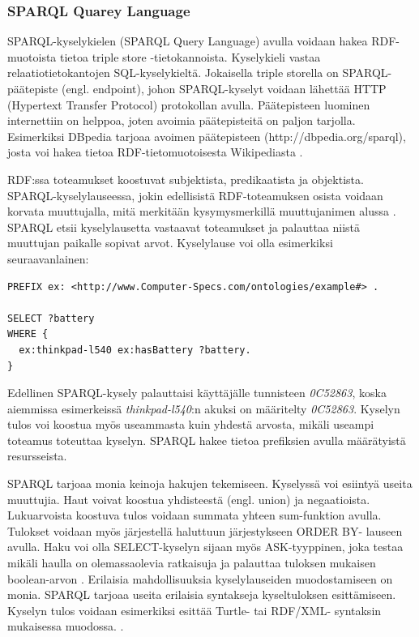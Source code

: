 \documentclass[finnish, 12pt, a4paper, elec, utf8, pdfa, online]{aaltothesis}
\begin{document}
{\subsubsection{SPARQL Quarey Language}
SPARQL-kyselykielen (SPARQL Query Language) avulla voidaan hakea RDF-muotoista tietoa triple store -tietokannoista. Kyselykieli vastaa relaatiotietokantojen SQL-kyselykieltä. Jokaisella triple storella on SPARQL-päätepiste (engl. endpoint), johon SPARQL-kyselyt voidaan lähettää HTTP (Hypertext Transfer Protocol) protokollan avulla. Päätepisteen luominen internettiin on helppoa, joten avoimia päätepisteitä on paljon tarjolla. Esimerkiksi DBpedia tarjoaa avoimen päätepisteen (http://dbpedia.org/sparql), josta voi hakea tietoa RDF-tietomuotoisesta Wikipediasta \cite{Antoniou}.

RDF:ssa toteamukset koostuvat subjektista, predikaatista ja objektista. SPARQL-kyselylauseessa, jokin edellisistä RDF-toteamuksen osista voidaan korvata muuttujalla, mitä merkitään kysymysmerkillä muuttujanimen alussa \cite{Antoniou}. SPARQL etsii kyselylausetta vastaavat toteamukset ja palauttaa niistä muuttujan paikalle sopivat arvot. Kyselylause voi olla esimerkiksi seuraavanlainen:

\begin{lstlisting}[style=codeblock]
PREFIX ex: <http://www.Computer-Specs.com/ontologies/example#> .

SELECT ?battery
WHERE {
  ex:thinkpad-l540 ex:hasBattery ?battery.
}
\end{lstlisting}

Edellinen SPARQL-kysely palauttaisi käyttäjälle tunnisteen \textit{0C52863}, koska aiemmissa esimerkeissä \textit{thinkpad-l540}:n akuksi on määritelty \textit{0C52863}. Kyselyn tulos voi koostua myös useammasta kuin yhdestä arvosta, mikäli useampi toteamus toteuttaa kyselyn. SPARQL hakee tietoa prefiksien avulla määrätyistä resursseista.

SPARQL tarjoaa monia keinoja hakujen tekemiseen. Kyselyssä voi esiintyä useita muuttujia.
Haut voivat koostua yhdisteestä (engl. union) ja negaatioista. Lukuarvoista koostuva tulos voidaan summata yhteen sum-funktion avulla. Tulokset voidaan myös järjestellä haluttuun järjestykseen ORDER BY- lauseen avulla. Haku voi olla SELECT-kyselyn sijaan myös ASK-tyyppinen, joka testaa mikäli haulla on olemassaolevia ratkaisuja ja palauttaa tuloksen mukaisen boolean-arvon \cite{sparql_query}. Erilaisia mahdollisuuksia kyselylauseiden muodostamiseen on monia. SPARQL tarjoaa useita erilaisia syntakseja kyseltuloksen esittämiseen. Kyselyn tulos voidaan esimerkiksi esittää Turtle- tai RDF/XML- syntaksin mukaisessa muodossa. \cite{W3C_turtle}.


}
\end{document}
